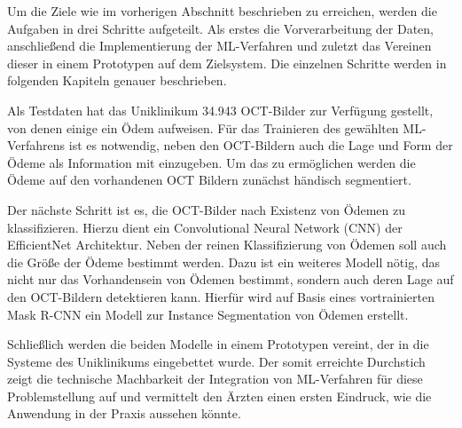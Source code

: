 Um die Ziele wie im vorherigen Abschnitt beschrieben zu erreichen, werden die Aufgaben in drei Schritte aufgeteilt. Als erstes die Vorverarbeitung der Daten, anschließend die Implementierung der ML-Verfahren und zuletzt das Vereinen dieser in einem Prototypen auf dem Zielsystem. Die einzelnen Schritte werden in folgenden Kapiteln genauer beschrieben. 

Als Testdaten hat das Uniklinikum 34.943 OCT-Bilder zur Verfügung gestellt, von denen einige ein Ödem aufweisen. 
Für das Trainieren des gewählten ML-Verfahrens ist es notwendig, neben den OCT-Bildern auch die Lage und Form der Ödeme als Information mit einzugeben. 
Um das zu ermöglichen werden die Ödeme auf den vorhandenen OCT Bildern zunächst händisch segmentiert. 

Der nächste Schritt ist es, die OCT-Bilder nach Existenz von Ödemen zu klassifizieren. Hierzu dient ein Convolutional Neural Network (CNN) der EfficientNet Architektur. Neben der reinen Klassifizierung von Ödemen soll auch die Größe der Ödeme bestimmt werden. Dazu ist ein weiteres Modell nötig, das nicht nur das Vorhandensein von Ödemen bestimmt, sondern auch deren Lage auf den OCT-Bildern detektieren kann. Hierfür wird auf Basis eines vortrainierten Mask R-CNN ein Modell zur Instance Segmentation von Ödemen erstellt.

Schließlich werden die beiden Modelle in einem Prototypen vereint, der in die Systeme des Uniklinikums eingebettet wurde. Der somit erreichte Durchstich zeigt die technische Machbarkeit der Integration von ML-Verfahren für diese Problemstellung auf und vermittelt den Ärzten einen ersten Eindruck, wie die Anwendung in der Praxis aussehen könnte. 